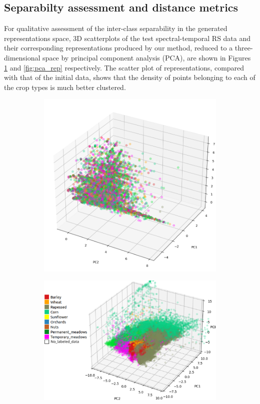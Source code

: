 \documentclass[journal,article,submit,pdftex,moreauthors]{Definitions/mdpi}
\begin{document}
\subsection{Separabilty assessment and distance metrics}
For qualitative assessment of the inter-class separability in the generated representations space, 
3D scatterplots of the test spectral-temporal RS data and their corresponding representations produced by our method, reduced to a three-dimensional space by principal component analysis (PCA), are shown in Figures \ref{fig:pca_raw} and \ref{fig:pca_rep} respectively.
The scatter plot of representations, compared with that of the initial data, shows that the density of points belonging to each of the crop types is much better clustered.
\begin{figure}[H]
	\centering
	\begin{subfigure}[t]{0.4\linewidth}
		\centering
		\includegraphics[width=0.9\linewidth]{figures/pcs_2.png}
		\caption{}
	  \label{fig:pca_raw}
	\end{subfigure}
	\begin{subfigure}[t]{0.5\linewidth}
		\centering
		\includegraphics[width=0.9\linewidth]{figures/PCA_3D_W_classes.pdf}

\end{subfigure}
\end{figure}
\end{document}
